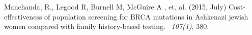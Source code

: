 \documentclass[11pt, letterpaper]{article}
\begin{document}



\begin{thebibliography}{}
	
	Manchanda, R., Legood R, Burnell M, McGuire A , et. al.  (2015, July)
	\newblock Cost-effectiveness of population screening for {BRCA} mutations in {A}shkenazi jewish women compared with family history-based testing.
	~{\em 107(1)}, 380.
	
\end{thebibliography}
\end{document}
